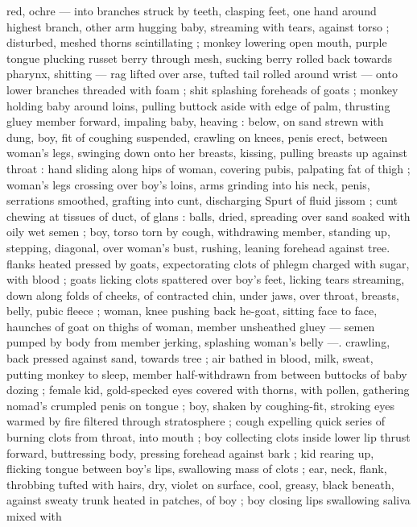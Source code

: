 red, ochre --- into branches struck by teeth, clasping feet, one hand 
around highest branch, other arm hugging baby, streaming with 
tears, against torso ; disturbed, meshed thorns scintillating ; monkey 
lowering open mouth, purple tongue plucking russet berry through 
mesh, sucking berry rolled back towards pharynx, shitting --- rag 
lifted over arse, tufted tail rolled around wrist --- onto lower 
branches threaded with foam ; shit splashing foreheads of goats ; 
monkey holding baby around loins, pulling buttock aside with edge 
of palm, thrusting gluey member forward, impaling baby, heaving : 
below, on sand strewn with dung, boy, fit of coughing suspended, 
crawling on knees, penis erect, between woman's legs, swinging 
down onto her breasts, kissing, pulling breasts up against throat : 
hand sliding along hips of woman, covering pubis, palpating fat of 
thigh ; woman's legs crossing over boy's loins, arms grinding into his 
neck, penis, serrations smoothed, grafting into cunt, discharging 
Spurt of fluid jissom ; cunt chewing at tissues of duct, of glans : 
balls, dried, spreading over sand soaked with oily wet semen ; boy, 
torso torn by cough, withdrawing member, standing up, stepping, 
diagonal, over woman's bust, rushing, leaning forehead against tree. 
flanks heated pressed by goats, expectorating clots of phlegm 
charged with sugar, with blood ; goats licking clots spattered over 
boy's feet, licking tears streaming, down along folds of cheeks, of 
contracted chin, under jaws, over throat, breasts, belly, pubic fleece 
; woman, knee pushing back he-goat, sitting face to face, haunches 
of goat on thighs of woman, member unsheathed gluey --- semen 
pumped by body from member jerking, splashing woman's belly ---. 
crawling, back pressed against sand, towards tree ; air bathed in 
blood, milk, sweat, putting monkey to sleep, member half-withdrawn 
from between buttocks of baby dozing ; female kid, gold-specked 
eyes covered with thorns, with pollen, gathering nomad's crumpled 
penis on tongue ; boy, shaken by coughing-fit, stroking eyes warmed 
by fire filtered through stratosphere ; cough expelling quick series of 
burning clots from throat, into mouth ; boy collecting clots inside 
lower lip thrust forward, buttressing body, pressing forehead against 
bark ; kid rearing up, flicking tongue between boy's lips, swallowing 
mass of clots ; ear, neck, flank, throbbing tufted with hairs, dry, violet 
on surface, cool, greasy, black beneath, against sweaty trunk heated 
in patches, of boy ; boy closing lips swallowing saliva mixed with 
